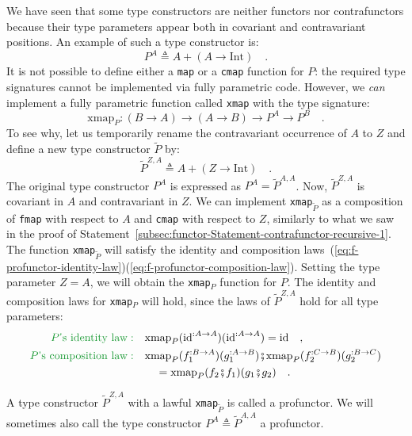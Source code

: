 We have seen that some type constructors are neither functors nor
contrafunctors because their type parameters appear both in covariant
and contravariant positions. An example of such a type constructor
is:
\[
P^{A}\triangleq A+\left(A\rightarrow\text{Int}\right)\quad.
\]
It is not possible to define either a \lstinline!map! or a \lstinline!cmap!
function for $P$: the required type signatures cannot be implemented
via fully parametric code. However, we \emph{can} implement a fully
parametric function called \lstinline!xmap! with the type signature:
\[
\text{xmap}_{P}:\left(B\rightarrow A\right)\rightarrow\left(A\rightarrow B\right)\rightarrow P^{A}\rightarrow P^{B}\quad.
\]
To see why, let us temporarily rename the contravariant occurrence
of $A$ to $Z$ and define a new type constructor $\tilde{P}$ by:
\[
\tilde{P}^{Z,A}\triangleq A+\left(Z\rightarrow\text{Int}\right)\quad.
\]
The original type constructor $P^{A}$ is expressed as $P^{A}=\tilde{P}^{A,A}$.
Now, $\tilde{P}^{Z,A}$ is covariant in $A$ and contravariant in
$Z$. We can implement \lstinline!xmap!$_{\tilde{P}}$ as a composition
of \lstinline!fmap! with respect to $A$ and \lstinline!cmap! with
respect to $Z$, similarly to what we saw in the proof of Statement~\ref{subsec:functor-Statement-contrafunctor-recursive-1}.
The function \lstinline!xmap!$_{\tilde{P}}$ will satisfy the identity
and composition laws~(\ref{eq:f-profunctor-identity-law})\textendash (\ref{eq:f-profunctor-composition-law}).
Setting the type parameter $Z=A$, we will obtain the \lstinline!xmap!$_{P}$
function for $P$. The identity and composition laws for \lstinline!xmap!$_{P}$
will hold, since the laws of $\tilde{P}^{Z,A}$ hold for all type
parameters:
\begin{align*}
{\color{greenunder}P\text{\textsf{'}s identity law}:}\quad & \text{xmap}_{P}(\text{id}^{:A\rightarrow A})(\text{id}^{:A\rightarrow A})=\text{id}\quad,\\
{\color{greenunder}P\text{\textsf{'}s composition law}:}\quad & \text{xmap}_{P}(f_{1}^{:B\rightarrow A})(g_{1}^{:A\rightarrow B})\bef\text{xmap}_{P}(f_{2}^{:C\rightarrow B})(g_{2}^{:B\rightarrow C})\\
 & \quad=\text{xmap}_{P}(f_{2}\bef f_{1})(g_{1}\bef g_{2})\quad.
\end{align*}

A type constructor $\tilde{P}^{Z,A}$ with a lawful \lstinline!xmap!$_{\tilde{P}}$
is called a profunctor. We will sometimes also
call the type constructor $P^{A}\triangleq\tilde{P}^{A,A}$ a profunctor.

